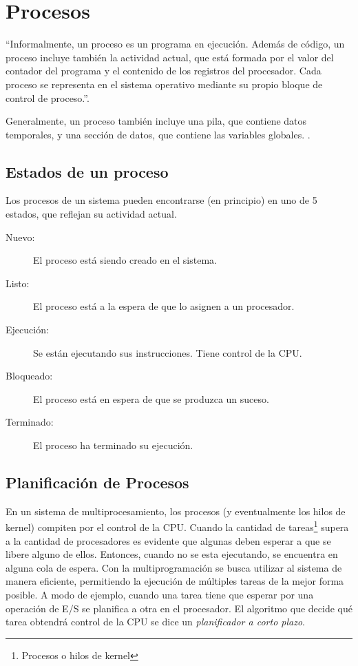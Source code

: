 \section{Procesos}

``Informalmente, un proceso es un programa en ejecución. Además de código, un proceso incluye también la actividad actual, que
está formada por el valor del contador del programa y el contenido de los registros del procesador.
Cada proceso se representa en el sistema operativo mediante su propio bloque de control de proceso.''\cite{silberschatz}.

Generalmente, un proceso también incluye una pila, que contiene datos temporales, y una sección de datos, 
que contiene las variables globales.
\cite{silberschatz}.

\subsection{Estados de un proceso}

Los procesos de un sistema pueden encontrarse (en principio) en uno de 5 estados, que reflejan su actividad actual.

\begin{description}
	\item[Nuevo:] El proceso está siendo creado en el sistema.
	\item[Listo:] El proceso está a la espera de que lo asignen a un procesador.
	\item[Ejecución:] Se están ejecutando sus instrucciones. Tiene control de la CPU.
	\item[Bloqueado:] El proceso está en espera de que se produzca un suceso.
	\item[Terminado:] El proceso ha terminado su ejecución.
\end{description}

\subsection{Planificación de Procesos}

En un sistema de multiprocesamiento, los procesos (y eventualmente los hilos de kernel) compiten por el control de la CPU.
Cuando la cantidad de tareas\footnote{Procesos o hilos de kernel} supera a la cantidad de procesadores es evidente que algunas
deben esperar a que se libere alguno de ellos. Entonces, cuando no se esta ejecutando, se encuentra en alguna cola de espera.
Con la multiprogramación se busca utilizar al sistema de manera eficiente, permitiendo la ejecución de múltiples tareas de la mejor forma posible.
A modo de ejemplo, cuando una tarea tiene que esperar por una operación de E/S se planifica a otra en el procesador.
El algoritmo que decide qué tarea obtendrá control de la CPU se dice un \emph{planificador a corto plazo}\cite{silberschatz}.

